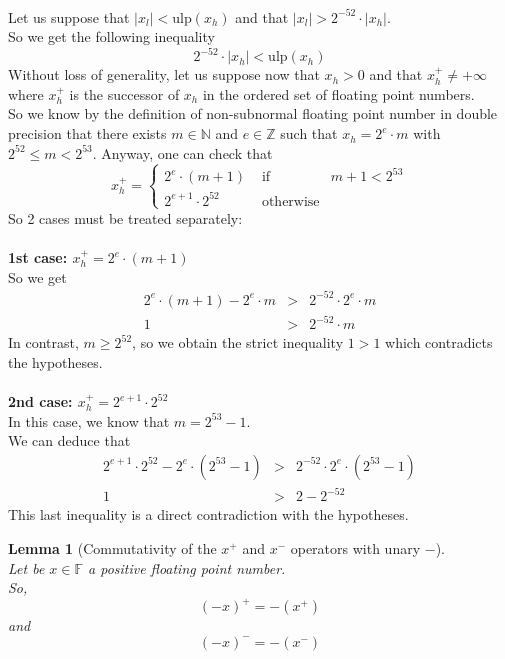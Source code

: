 \documentclass[a4paper,10pt,twoside]{article}
\newtheorem{lemma}[theorem]{Lemma}
\newenvironment{proof}[1][Proof]{\begin{trivlist}
\item[\hskip \labelsep {\bfseries #1}]}{\end{trivlist}}
\newcommand{\qed}{\nobreak \ifvmode \relax \else \ifdim \lastskip<1.5em \hskip-\lastskip
\hskip1.5em plus0em minus0.5em \fi \nobreak \vrule height0.75em width0.5em depth0.25em\fi}
\newcommand{\N}{\ensuremath{\mathbb {N}}}
\newcommand{\Z}{\ensuremath{\mathbb {Z}}}
\newcommand{\F}{\ensuremath{\mathbb {F}}}
\newcommand{\hi}{\ensuremath{\mathit{h}}}
\newcommand{\lo}{\ensuremath{\mathit{l}}}
\newcommand{\mUlp}{\ensuremath{\mathrm{ulp}}}
\begin{document}
\begin{proof} ~ \\
Let us suppose that $\left \vert x_\lo \right \vert < \mUlp\left(x_\hi
\right)$ and that
$\left \vert x_\lo \right \vert > 2^{-52} \cdot \left \vert x_\hi \right \vert$.\\
So we get the following inequality
$$2^{-52} \cdot \left \vert x_\hi \right \vert < \mUlp\left( x_\hi \right)$$
Without loss of generality, let us suppose now that
$x_\hi > 0$ and that $x_\hi^+ \not = + \infty$ where $x_\hi^+$ is the
successor of
$x_\hi$ in the ordered set of floating point numbers.\\
So we know by the definition of non-subnormal floating point number in double
precision that there exists
$m \in \N$ and $e \in \Z$ such that
$x_\hi = 2^e \cdot m$ with $2^{52} \leq m < 2^{53}$. Anyway, one can check that
$$x_\hi^+ = \left \lbrace \begin{array}{lll} 2^e \cdot \left(m + 1 \right) & \mbox{ if } & m+1 < 2^{53} \\
                                             2^{e+1} \cdot 2^{52} & \mbox{ otherwise} & \end{array} \right.$$
So 2 cases must be treated separately:\\~\\
{\bf 1st case: $x_\hi^+ = 2^e \cdot \left( m + 1 \right)$} \\
So we get
\begin{eqnarray*}
2^e \cdot \left( m + 1 \right) - 2^e \cdot m & > & 2^{-52} \cdot 2^e \cdot m \\
1 & > &  2^{-52} \cdot m
\end{eqnarray*}
In contrast, $m \geq 2^{52}$, so we obtain the strict inequality $1 > 1$
which contradicts the hypotheses. \\~\\
{\bf 2nd case: $x_\hi^+ = 2^{e+1} \cdot 2^{52}$} \\
In this case, we know that $m=2^{53} - 1$. \\
We can deduce that
\begin{eqnarray*}
2^{e+1} \cdot 2^{52} - 2^e \cdot \left( 2^{53} - 1\right) & > & 2^{-52} \cdot 2^e \cdot \left( 2^{53} - 1 \right) \\
1 & > &  2 - 2^{-52}
\end{eqnarray*}
This last inequality is a direct contradiction with the hypotheses.\qed
\end{proof}
\begin{lemma}[Commutativity of the $x^+$ and $x^-$ operators with unary $-$] \label{commut} ~ \\
Let be $x \in \F$ a positive floating point number.\\
So,
$$\left( - x\right)^+ = -\left(x^+\right)$$
and
$$\left( - x\right)^- = -\left(x^-\right)$$
\end{lemma}
\end{document}

